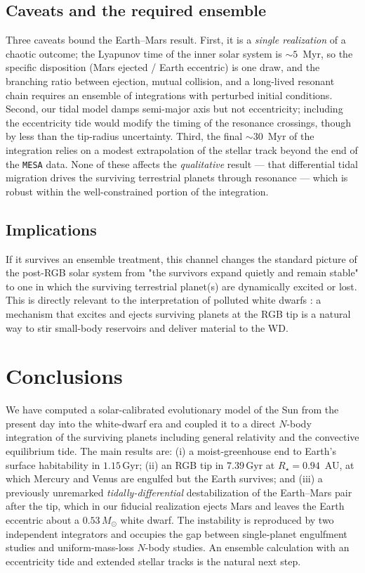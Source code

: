\documentclass[twocolumn]{aastex631}
\newcommand{\msun}{M_\odot}
\newcommand{\gyr}{\,\mathrm{Gyr}}
\newcommand{\code}[1]{\texttt{#1}}
\begin{document}
\subsection{Caveats and the required ensemble}

Three caveats bound the Earth--Mars result. First, it is a \emph{single realization}
of a chaotic outcome; the Lyapunov time of the inner solar system is $\sim5$~Myr, so
the specific disposition (Mars ejected / Earth eccentric) is one draw, and the
branching ratio between ejection, mutual collision, and a long-lived resonant chain
requires an ensemble of integrations with perturbed initial conditions. Second, our
tidal model damps semi-major axis but not eccentricity; including the eccentricity
tide would modify the timing of the resonance crossings, though by less than the
tip-radius uncertainty. Third, the final $\sim30$~Myr of the integration relies on a
modest extrapolation of the stellar track beyond the end of the \code{MESA} data.
None of these affects the \emph{qualitative} result --- that differential tidal
migration drives the surviving terrestrial planets through resonance --- which is
robust within the well-constrained portion of the integration.

\subsection{Implications}

If it survives an ensemble treatment, this channel changes the standard picture of
the post-RGB solar system from "the survivors expand quietly and remain stable"
to one in which the surviving terrestrial planet(s) are dynamically excited or
lost. This is directly relevant to the interpretation of polluted white dwarfs
\citep{Veras2016}: a mechanism that excites and ejects surviving planets at the RGB
tip is a natural way to stir small-body reservoirs and deliver material to the WD.

\section{Conclusions}
\label{sec:conclusion}

We have computed a solar-calibrated evolutionary model of the Sun from the present
day into the white-dwarf era and coupled it to a direct $N$-body integration of the
surviving planets including general relativity and the convective equilibrium tide.
The main results are: (i) a moist-greenhouse end to Earth's surface habitability in
$1.15\gyr$; (ii) an RGB tip in $7.39\gyr$ at $R_\star=0.94$~AU, at which Mercury and
Venus are engulfed but the Earth survives; and (iii) a previously unremarked
\emph{tidally-differential} destabilization of the Earth--Mars pair after the tip,
which in our fiducial realization ejects Mars and leaves the Earth eccentric about a
$0.53\,\msun$ white dwarf. The instability is reproduced by two independent
integrators and occupies the gap between single-planet engulfment studies and
uniform-mass-loss $N$-body studies. An ensemble calculation with an eccentricity
tide and extended stellar tracks is the natural next step.
\end{document}
